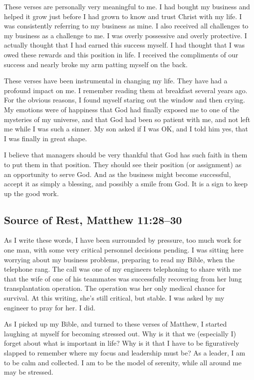 \documentclass[12pt]{memoir}
\begin{document}
These verses are personally very meaningful to me. I had bought my business and helped it grow just before I had grown to know and trust Christ with my life.
I was consistently referring to my business as mine.
I also received all challenges to my business as a
challenge to me. I was overly possessive and overly protective. I
actually thought that I had earned this success myself. I had thought that I was owed these rewards and this position in life.
I received the compliments of our success and nearly broke my arm patting myself on the back. 

These verses have been instrumental in changing my life. They have
had a profound impact on me. I remember reading them at breakfast
several years ago. For the obvious reasons, I found myself staring
out the window and then crying. My emotions were of happiness that
God had finally exposed me to one of the mysteries of my universe,
and that God had been so patient with me, and not left me while I
was such a sinner. My son asked if I was OK, and I told him yes, that
I was finally in great shape.

I believe that managers should be very thankful that God has such
faith in them to put them in that position. They should see their
position (or assignment) as an opportunity to serve God. And as the
business might become successful, accept it as simply a blessing,
and possibly a smile from God. It is a sign to keep up the good work.

\subsection[Source of Rest]{Source of Rest, Matthew 11:28--30}

As I write these words, I have been surrounded by pressure, too much
work for one man, with some very critical personnel decisions pending.
I was sitting here worrying about my business problems, preparing
to read my Bible, when the telephone rang. The call was one of my
engineers telephoning to share with me that the wife of one of his
teammates was successfully recovering from her lung transplantation
operation. The operation was her only medical chance for survival.
At this writing, she's still critical, but stable. I was asked by my
engineer to pray for her. I did.

As I picked up my Bible, and turned to these verses of Matthew, I
started laughing at myself for becoming stressed out. Why is
it that we (especially I) forget about what is important in life?
Why is it that I have to be figuratively slapped to remember
where my focus and leadership must be? As a leader, I am to be calm
and collected. I am to be the model of serenity, while all around
me may be stressed.
\end{document}
